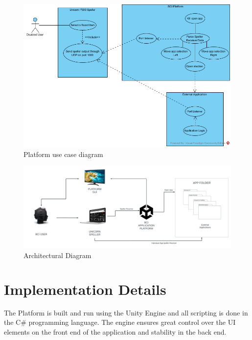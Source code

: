 \begin{figure}[H]
  \centering
  \includegraphics[width=1\textwidth]{Diagrams/Platform Use Case.jpg}
  \caption{Platform use case diagram}
\end{figure}
\begin{figure}[H]
  \centering
  \includegraphics[width=1\textwidth]{Diagrams/Platform Architectural.png}
  \caption{Architectural Diagram}
\end{figure}


\section{Implementation Details}
The Platform is built and run using the Unity Engine and all scripting is done in the C\# programming language. The engine ensures great control over the UI elements on the front end of the application and stability in the back end.

